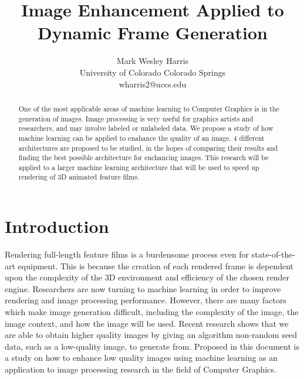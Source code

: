 \documentclass[letterpaper]{article} %
\title{Image Enhancement Applied to Dynamic Frame Generation}
\author{Mark Wesley Harris\\ %
University of Colorado Colorado Springs\\
wharris2@uccs.edu %
}
\begin{document}
\maketitle

\begin{abstract}
One of the most applicable areas of machine learning to Computer Graphics is in the
generation of images. Image processing is very useful for graphics artists and
researchers, and may involve labeled or unlabeled data. We propose
a study of how machine learning can be applied to enahance the quality of an image.
4 different architectures are proposed to be studied, in the hopes of comparing
their results and finding the best possible architecture for enchancing images.
This research will be applied to a larger machine learning architecture that will be used to
speed up rendering of 3D animated feature films.
\end{abstract}

\section{Introduction}
\label{sec:introduction}
Rendering full-length feature films is a burdensome process
even for state-of-the-art equipment.
This is because the creation of each rendered frame is dependent upon the
complexity of the 3D environment and
efficiency of the chosen render engine.
Researchers are now turning to machine learning in order to improve
rendering and image processing performance.
However, there are many factors which make image generation difficult, including
the complexity of the image, the image context, and how the image will be used.
Recent research shows that we are able to obtain higher quality images by giving
an algorithm non-random seed data, such as a low-quality image, to generate from.
Proposed in this document is a study
on how to enhance low quality images using machine learning
as an application to image processing research in the field of Computer Graphics.

\end{document}

